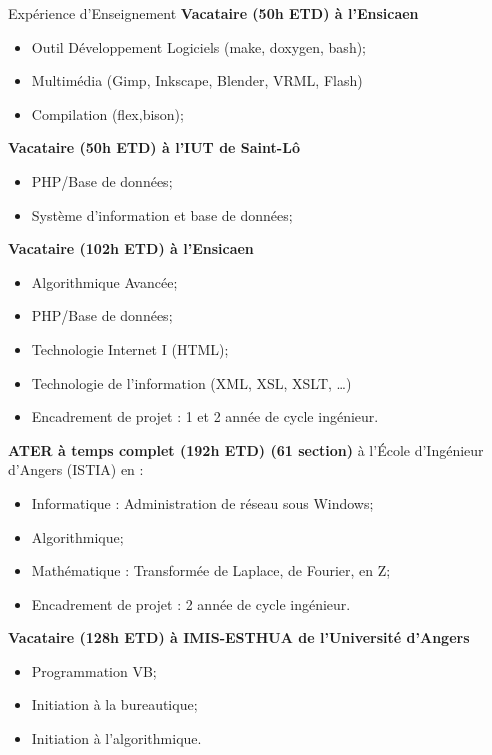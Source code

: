 

\begin{rubric}{Expérience d'Enseignement}
  \entry*[2010-2011]
  \textbf{Vacataire (50h ETD) à l'Ensicaen}
  \begin{itemize} 
  \item Outil Développement Logiciels (make, doxygen, bash);
  \item Multimédia (Gimp, Inkscape, Blender, VRML, Flash)
  \item Compilation (flex,bison);
  \end{itemize}
  \entry*[]\textbf{Vacataire (50h ETD) à l'IUT de Saint-Lô}
  \begin{itemize} 
  \item PHP/Base de données;
  \item Système d'information et base de données;
  \end{itemize}


  \entry*[2009-2010]
  \textbf{Vacataire (102h ETD) à l'Ensicaen}
  \begin{itemize} 
  \item Algorithmique Avancée;
  \item PHP/Base de données;
  \item Technologie Internet I (HTML);
  \item Technologie de l'information (XML, XSL, XSLT, \ldots)
  \item Encadrement de projet : 1 et 2 année de cycle ingénieur.
  \end{itemize}

  \entry*[2008-2009]
  \textbf{ATER à temps complet (192h ETD) (61 section)} à l'\'Ecole d'Ingénieur d'Angers (ISTIA) en :
  \begin{itemize}
  \item Informatique : Administration de réseau sous Windows;
  \item Algorithmique;
  \item Mathématique : Transformée de Laplace, de Fourier, en Z;
  \item Encadrement de projet : 2 année de cycle ingénieur.
  \end{itemize}

  \entry*[2005-2007]
  \textbf{Vacataire (128h ETD) à IMIS-ESTHUA de l'Université d'Angers}
  \begin{itemize}
  \item Programmation VB;
  \item Initiation à la bureautique;
  \item Initiation à l'algorithmique.
  \end{itemize}


\end{rubric}

